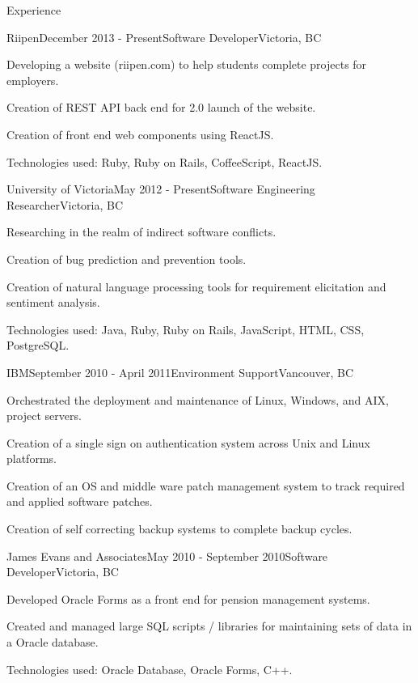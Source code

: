 \documentclass{resume} %
\begin{document}
\begin{rSection}{Experience}


\begin{rSubsection}{Riipen}{December 2013 - Present}{Software Developer}{Victoria, BC}
\item Developing a website (riipen.com) to help students complete projects for employers.
\item Creation of REST API back end for 2.0 launch of the website.
\item Creation of front end web components using ReactJS.
\item Technologies used: Ruby, Ruby on Rails, CoffeeScript, ReactJS.
\end{rSubsection}


\begin{rSubsection}{University of Victoria}{May 2012 - Present}{Software Engineering Researcher}{Victoria, BC}
\item Researching in the realm of indirect software conflicts.
\item Creation of bug prediction and prevention tools.
\item Creation of natural language processing tools for requirement elicitation and sentiment analysis.
\item Technologies used: Java, Ruby, Ruby on Rails, JavaScript, HTML, CSS, PostgreSQL.
\end{rSubsection}


\begin{rSubsection}{IBM}{September 2010 - April 2011}{Environment Support}{Vancouver, BC}
\item Orchestrated the deployment and maintenance of Linux, Windows, and AIX, project servers.
\item Creation of a single sign on authentication system across Unix and Linux platforms.
\item Creation of an OS and middle ware patch management system to track required and applied software patches.
\item Creation of self correcting backup systems to complete backup cycles.
\end{rSubsection}


\begin{rSubsection}{James Evans and Associates}{May 2010 - September 2010}{Software Developer}{Victoria, BC}
\item Developed Oracle Forms as a front end for pension management systems.
\item Created and managed large SQL scripts / libraries for maintaining sets of data in a Oracle database.
\item Technologies used: Oracle Database, Oracle Forms, C++.
\end{rSubsection}

\end{rSection}
\end{document}
